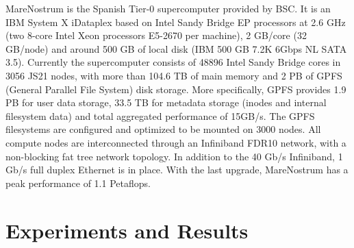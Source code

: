 \documentclass[journal]{IEEEtran}
\begin{document}
MareNostrum is the Spanish Tier-0 supercomputer provided by BSC. It is an IBM System X iDataplex based on Intel Sandy Bridge EP processors at 2.6 GHz (two 8-core Intel Xeon processors E5-2670 per machine), 2 GB/core (32 GB/node) and around 500 GB of local disk (IBM 500 GB  7.2K 6Gbps NL SATA 3.5). Currently the supercomputer consists of 48896 Intel Sandy Bridge cores in 3056 JS21 nodes, with more than 104.6 TB of main memory and 2 PB of GPFS (General Parallel File System) disk storage. More specifically, GPFS provides 1.9 PB for user data storage,
33.5 TB for metadata storage (inodes and internal filesystem data) and total aggregated performance of 15GB/s.
The GPFS filesystems are configured and optimized to be mounted on 3000 nodes.
All compute nodes are interconnected through an Infiniband FDR10 network, with a non-blocking fat tree network topology. In addition to the 40 Gb/s Infiniband, 1 Gb/s full duplex Ethernet is in place. With the last upgrade, MareNostrum has a peak performance of 1.1 Petaflops.


\section{Experiments and Results}
\end{document}
